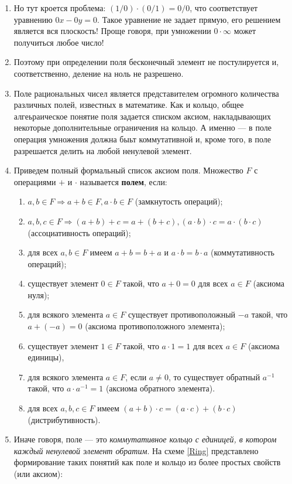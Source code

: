 \begin{enumerate}
\item Но тут кроется проблема: $(1/0)\cdot(0/1)=0/0$, что соответствует уравнению $0x-0y=0$. Такое уравнение не задает прямую, его решением является вся плоскость! Проще говоря, при умножении $0\cdot\infty$ может получиться любое число!
\item Поэтому при определении поля бесконечный элемент не постулируется и, соответственно, деление на ноль не разрешено.
\item Поле рациональных чисел является представителем огромного количества различных полей, известных в математике. Как и кольцо, общее алгеьраическое понятие поля задается списком аксиом, накладывающих некоторые дополнительные ограничения на кольцо. А именно --- в поле операция умножения должна быьт коммутативной и, кроме того, в поле разрешается делить на любой ненулевой элемент.
\item Приведем полный формальный список аксиом поля. Множество $F$ с операциями $+$ и $\cdot$ называется \textbf{полем}, если:\label{FildAxiom}
\begin{enumerate}[{\bf F}1]
\item $a,b\in F\Rightarrow a+b\in F, a\cdot b\in F$ (замкнутость операций);
\item $a,b,c\in F\Rightarrow (a+b)+c=a+(b+c), (a\cdot b)\cdot c = a\cdot (b\cdot c)$ (ассоциативность операций);
\item для всех $a,b\in F$ имеем $a+b=b+a$ и $a\cdot b=b\cdot a$ (коммутативность операций);
\item существует элемент $0\in F$ такой, что $a+0=0$ для всех $a\in F$ (аксиома нуля);
\item для всякого элемента $a\in F$ существует противоположный $-a$ такой, что $a+(-a)=0$ (аксиома противоположного элемента);
\item существует элемент $1\in F$ такой, что $a\cdot 1=1$ для всех $a\in F$ (аксиома единицы),
\item для всякого элемента $a\in F$, если $a\ne 0$, то существует обратный $a^{-1}$ такой, что $a\cdot a^{-1}=1$ (аксиома обратного элемента).
\item для всех $a,b,c\in F$ имеем $(a+b)\cdot c=(a\cdot c)+(b\cdot c)$ (дистрибутивность).
\end{enumerate}
\item Иначе говоря, поле --- это \textit{коммутативное кольцо с единицей, в котором каждый ненулевой элемент обратим}. На схеме \ref{Ring} представлено формирование таких понятий как поле и кольцо из более простых свойств (или аксиом):

\end{enumerate}
